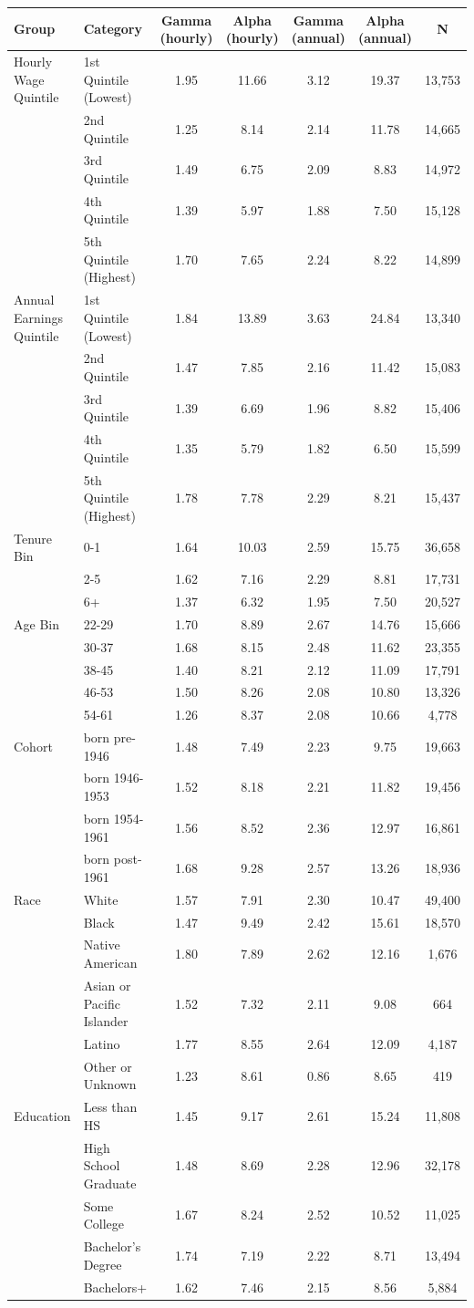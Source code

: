 \begin{tabular}{llccccc}
\hline\hline
Group & Category & Gamma (hourly) & Alpha (hourly) & Gamma (annual) & Alpha (annual) & N \\
\hline
Hourly Wage Quintile&1st Quintile (Lowest)&1.95&11.66&3.12&19.37&13,753\\
&2nd Quintile&1.25&8.14&2.14&11.78&14,665\\
&3rd Quintile&1.49&6.75&2.09&8.83&14,972\\
&4th Quintile&1.39&5.97&1.88&7.50&15,128\\
&5th Quintile (Highest)&1.70&7.65&2.24&8.22&14,899\\
Annual Earnings Quintile&1st Quintile (Lowest)&1.84&13.89&3.63&24.84&13,340\\
&2nd Quintile&1.47&7.85&2.16&11.42&15,083\\
&3rd Quintile&1.39&6.69&1.96&8.82&15,406\\
&4th Quintile&1.35&5.79&1.82&6.50&15,599\\
&5th Quintile (Highest)&1.78&7.78&2.29&8.21&15,437\\
Tenure Bin&0-1&1.64&10.03&2.59&15.75&36,658\\
&2-5&1.62&7.16&2.29&8.81&17,731\\
&6+&1.37&6.32&1.95&7.50&20,527\\
Age Bin&22-29&1.70&8.89&2.67&14.76&15,666\\
&30-37&1.68&8.15&2.48&11.62&23,355\\
&38-45&1.40&8.21&2.12&11.09&17,791\\
&46-53&1.50&8.26&2.08&10.80&13,326\\
&54-61&1.26&8.37&2.08&10.66&4,778\\
Cohort&born pre-1946&1.48&7.49&2.23&9.75&19,663\\
&born 1946-1953&1.52&8.18&2.21&11.82&19,456\\
&born 1954-1961&1.56&8.52&2.36&12.97&16,861\\
&born post-1961&1.68&9.28&2.57&13.26&18,936\\
Race&White&1.57&7.91&2.30&10.47&49,400\\
&Black&1.47&9.49&2.42&15.61&18,570\\
&Native American&1.80&7.89&2.62&12.16&1,676\\
&Asian or Pacific Islander&1.52&7.32&2.11&9.08&664\\
&Latino&1.77&8.55&2.64&12.09&4,187\\
&Other or Unknown&1.23&8.61&0.86&8.65&419\\
Education&Less than HS&1.45&9.17&2.61&15.24&11,808\\
&High School Graduate&1.48&8.69&2.28&12.96&32,178\\
&Some College&1.67&8.24&2.52&10.52&11,025\\
&Bachelor's Degree&1.74&7.19&2.22&8.71&13,494\\
&Bachelors+&1.62&7.46&2.15&8.56&5,884\\
\hline\hline
\end{tabular}
